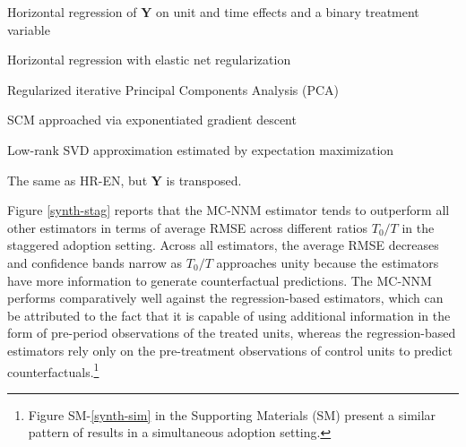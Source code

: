 \documentclass[12pt]{article}
\begin{document}
\begin{description}
	{\setlength\itemindent{1mm}
		\item[DID] Horizontal regression of $\mathbf{Y}$ on unit and time effects and a binary treatment variable \citep{athey2017matrix}
		\item[HR-EN] Horizontal regression with elastic net regularization \citep{athey2017matrix} 
		\item[PCA] Regularized iterative Principal Components Analysis (PCA) \citep{ilin2010practical,josse2012handling}
		\item[SC-ADH] SCM approached via exponentiated gradient descent \citep{abadie2010synthetic}
		\item[SVD] Low-rank SVD approximation estimated by expectation maximization \citep{troyanskaya2001missing}
		\item[VT-EN] The same as HR-EN, but $\mathbf{Y}$ is transposed.
	}
\end{description}
%
Figure \ref{synth-stag} reports that the MC-NNM estimator tends to outperform all other estimators in terms of average RMSE across different ratios $T_0/T$ in the staggered adoption setting. Across all estimators, the average RMSE decreases and confidence bands narrow as $T_0/T$ approaches unity because the estimators have more information to generate counterfactual predictions. The MC-NNM performs comparatively well against the regression-based estimators, which can be attributed to the fact that it is capable of using additional information in the form of pre-period observations of the treated units, whereas the regression-based estimators rely only on the pre-treatment observations of control units to predict counterfactuals.\footnote{Figure SM-\ref{synth-sim} in the Supporting Materials (SM) present a similar pattern of results in a simultaneous adoption setting.}
\end{document}
